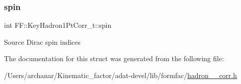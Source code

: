 \subsubsection{\texorpdfstring{spin}{spin}}
{\footnotesize\ttfamily int F\+F\+::\+Key\+Hadron1\+Pt\+Corr\+\_\+t\+::spin}

Source Dirac spin indices 

The documentation for this struct was generated from the following file\+:\begin{DoxyCompactItemize}
\item 
/\+Users/archanar/\+Kinematic\+\_\+factor/adat-\/devel/lib/formfac/\mbox{\hyperlink{adat-devel_2lib_2formfac_2hadron__1pt__corr_8h}{hadron\+\_\+1pt\+\_\+corr.\+h}}\end{DoxyCompactItemize}
